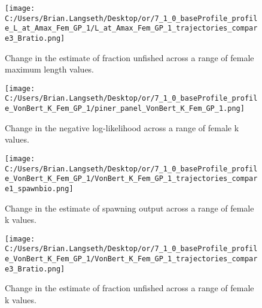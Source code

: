 \documentclass[11pt,
  english,
  a4paper,
]{article}
\begin{document}
\tagmcend\tagstructend


\begin{figure}
\centering
\texttt{[image: C:/Users/Brian.Langseth/Desktop/or/7\_1\_0\_baseProfile\_profile\_L\_at\_Amax\_Fem\_GP\_1/L\_at\_Amax\_Fem\_GP\_1\_trajectories\_compare3\_Bratio.png]}
\caption{Change in the estimate of fraction unfished across a range of female maximum length values.\label{fig:linf-depl}}
\end{figure}

\tagmcend\tagstructend


\begin{figure}
\centering
\texttt{[image: C:/Users/Brian.Langseth/Desktop/or/7\_1\_0\_baseProfile\_profile\_VonBert\_K\_Fem\_GP\_1/piner\_panel\_VonBert\_K\_Fem\_GP\_1.png]}
\caption{Change in the negative log-likelihood across a range of female k values.\label{fig:k-profile}}
\end{figure}

\tagmcend\tagstructend


\begin{figure}
\centering
\texttt{[image: C:/Users/Brian.Langseth/Desktop/or/7\_1\_0\_baseProfile\_profile\_VonBert\_K\_Fem\_GP\_1/VonBert\_K\_Fem\_GP\_1\_trajectories\_compare1\_spawnbio.png]}
\caption{Change in the estimate of spawning output across a range of female k values.\label{fig:k-ssb}}
\end{figure}

\tagmcend\tagstructend


\begin{figure}
\centering
\texttt{[image: C:/Users/Brian.Langseth/Desktop/or/7\_1\_0\_baseProfile\_profile\_VonBert\_K\_Fem\_GP\_1/VonBert\_K\_Fem\_GP\_1\_trajectories\_compare3\_Bratio.png]}
\caption{Change in the estimate of fraction unfished across a range of female k values.\label{fig:k-depl}}
\end{figure}
\end{document}
